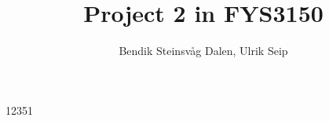 \documentclass[a4paper]{article}
\title{Project 2 in FYS3150}
\author{Bendik Steinsvåg Dalen, Ulrik Seip}
\begin{document}
\maketitle

\section{}
\subsection{}
12351


\end{document}
